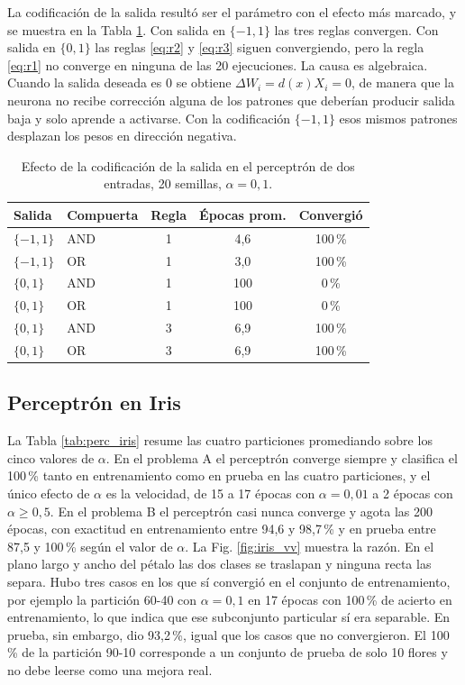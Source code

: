 \documentclass[conference]{IEEEtran}
\begin{document}
La codificaci\'on de la salida result\'o ser el par\'ametro con el efecto m\'as marcado, y se muestra en la Tabla \ref{tab:codif}. Con salida en $\{-1,1\}$ las tres reglas convergen. Con salida en $\{0,1\}$ las reglas \eqref{eq:r2} y \eqref{eq:r3} siguen convergiendo, pero la regla \eqref{eq:r1} no converge en ninguna de las 20 ejecuciones. La causa es algebraica. Cuando la salida deseada es 0 se obtiene $\Delta W_i = d(x) X_i = 0$, de manera que la neurona no recibe correcci\'on alguna de los patrones que deber\'ian producir salida baja y solo aprende a activarse. Con la codificaci\'on $\{-1,1\}$ esos mismos patrones desplazan los pesos en direcci\'on negativa.

\begin{table}[!t]
\caption{Efecto de la codificaci\'on de la salida en el perceptr\'on de dos entradas, 20 semillas, $\alpha = 0{,}1$.}
\label{tab:codif}
\centering
\small
\begin{tabular}{@{}llccc@{}}
\toprule
Salida & Compuerta & Regla & \'Epocas prom. & Convergi\'o \\
\midrule
$\{-1,1\}$ & AND & 1 & 4,6 & 100\,\% \\
$\{-1,1\}$ & OR  & 1 & 3,0 & 100\,\% \\
$\{0,1\}$  & AND & 1 & 100 & 0\,\% \\
$\{0,1\}$  & OR  & 1 & 100 & 0\,\% \\
$\{0,1\}$  & AND & 3 & 6,9 & 100\,\% \\
$\{0,1\}$  & OR  & 3 & 6,9 & 100\,\% \\
\bottomrule
\end{tabular}
\end{table}

\subsection{Perceptr\'on en Iris}

La Tabla \ref{tab:perc_iris} resume las cuatro particiones promediando sobre los cinco valores de $\alpha$. En el problema A el perceptr\'on converge siempre y clasifica el 100\,\% tanto en entrenamiento como en prueba en las cuatro particiones, y el \'unico efecto de $\alpha$ es la velocidad, de 15 a 17 \'epocas con $\alpha = 0{,}01$ a 2 \'epocas con $\alpha \geq 0{,}5$. En el problema B el perceptr\'on casi nunca converge y agota las 200 \'epocas, con exactitud en entrenamiento entre 94,6 y 98,7\,\% y en prueba entre 87,5 y 100\,\% seg\'un el valor de $\alpha$. La Fig. \ref{fig:iris_vv} muestra la raz\'on. En el plano largo y ancho del p\'etalo las dos clases se traslapan y ninguna recta las separa. Hubo tres casos en los que s\'i convergi\'o en el conjunto de entrenamiento, por ejemplo la partici\'on 60-40 con $\alpha = 0{,}1$ en 17 \'epocas con 100\,\% de acierto en entrenamiento, lo que indica que ese subconjunto particular s\'i era separable. En prueba, sin embargo, dio 93,2\,\%, igual que los casos que no convergieron. El 100\,\% de la partici\'on 90-10 corresponde a un conjunto de prueba de solo 10 flores y no debe leerse como una mejora real.
\end{document}
